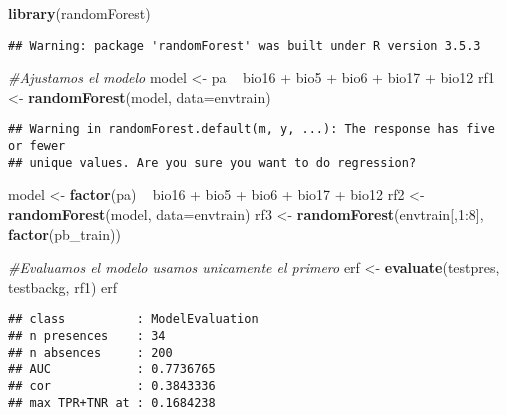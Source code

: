 \documentclass[]{article}
\newenvironment{Shaded}{\begin{snugshade}}{\end{snugshade}}
\newcommand{\KeywordTok}[1]{\textcolor[rgb]{0.13,0.29,0.53}{\textbf{{#1}}}}
\newcommand{\DataTypeTok}[1]{\textcolor[rgb]{0.13,0.29,0.53}{{#1}}}
\newcommand{\DecValTok}[1]{\textcolor[rgb]{0.00,0.00,0.81}{{#1}}}
\newcommand{\StringTok}[1]{\textcolor[rgb]{0.31,0.60,0.02}{{#1}}}
\newcommand{\CommentTok}[1]{\textcolor[rgb]{0.56,0.35,0.01}{\textit{{#1}}}}
\newcommand{\NormalTok}[1]{{#1}}
\begin{document}
\begin{Shaded}
\begin{Highlighting}[]
\KeywordTok{library}\NormalTok{(randomForest)}
\end{Highlighting}
\end{Shaded}

\begin{verbatim}
## Warning: package 'randomForest' was built under R version 3.5.3
\end{verbatim}

\begin{Shaded}
\begin{Highlighting}[]
\CommentTok{#Ajustamos el modelo}
\NormalTok{model <-}\StringTok{ }\NormalTok{pa ~}\StringTok{ }\NormalTok{bio16 +}\StringTok{ }\NormalTok{bio5 +}\StringTok{ }\NormalTok{bio6 +}\StringTok{ }\NormalTok{bio17 +}\StringTok{ }\NormalTok{bio12}
\NormalTok{rf1 <-}\StringTok{ }\KeywordTok{randomForest}\NormalTok{(model, }\DataTypeTok{data=}\NormalTok{envtrain)}
\end{Highlighting}
\end{Shaded}

\begin{verbatim}
## Warning in randomForest.default(m, y, ...): The response has five or fewer
## unique values. Are you sure you want to do regression?
\end{verbatim}

\begin{Shaded}
\begin{Highlighting}[]
\NormalTok{model <-}\StringTok{ }\KeywordTok{factor}\NormalTok{(pa) ~}\StringTok{ }\NormalTok{bio16 +}\StringTok{ }\NormalTok{bio5 +}\StringTok{ }\NormalTok{bio6 +}\StringTok{ }\NormalTok{bio17 +}\StringTok{ }\NormalTok{bio12}
\NormalTok{rf2 <-}\StringTok{ }\KeywordTok{randomForest}\NormalTok{(model, }\DataTypeTok{data=}\NormalTok{envtrain)}
\NormalTok{rf3 <-}\StringTok{ }\KeywordTok{randomForest}\NormalTok{(envtrain[,}\DecValTok{1}\NormalTok{:}\DecValTok{8}\NormalTok{], }\KeywordTok{factor}\NormalTok{(pb_train))}

\CommentTok{#Evaluamos el modelo usamos unicamente el primero}
\NormalTok{erf <-}\StringTok{ }\KeywordTok{evaluate}\NormalTok{(testpres, testbackg, rf1)}
\NormalTok{erf}
\end{Highlighting}
\end{Shaded}

\begin{verbatim}
## class          : ModelEvaluation 
## n presences    : 34 
## n absences     : 200 
## AUC            : 0.7736765 
## cor            : 0.3843336 
## max TPR+TNR at : 0.1684238
\end{verbatim}
\end{document}
